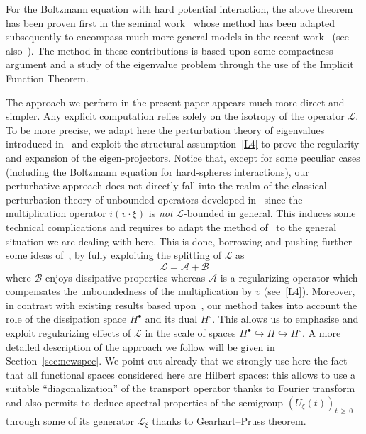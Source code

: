 \documentclass[10pt]{amsart}
\theoremstyle{definition}\newtheorem{defi}[theo]{Definition}\newtheorem{rema}[theo]{Remark}\newtheorem{exam}[theo]{Example}\newtheorem{exem}[theo]{Example}\newtheorem{nota}[theo]{Notation}
\renewcommand{\AA}{\mathcal{A}}
\newcommand{\BB}{\mathcal{B}}
\newcommand{\LL}{\mathcal{L}}
\newcommand{\Ss}{H}
\newcommand{\Ssp}{H^{\bullet}}
\newcommand{\Ssm}{H^{\circ}}
\renewcommand*\ge{\geqslant}
\begin{document}
For the Boltzmann equation with hard potential interaction, the above {theorem} has been proven first in the seminal work~\cite{EP1975} whose method has been {adapted} subsequently to encompass much more general models in the recent work~\cite{YY} (see also~\cite{LY2016, LY2017,YY23}). The method in these contributions is based upon some compactness argument and a study of the eigenvalue problem through the use of the Implicit Function Theorem.

The approach we perform in the present paper appears much more direct and simpler. Any explicit computation relies solely on the isotropy of the operator $\LL$. To be more precise, we adapt here the perturbation theory of eigenvalues introduced in~\cite{K1995} and exploit the structural assumption~\eqref{L4} to prove the regularity and expansion of the eigen-projectors. Notice that, except for some peculiar cases (including the Boltzmann equation for hard-spheres interactions), our perturbative approach does not directly fall into the realm of the classical perturbation theory of unbounded operators developed in~\cite{K1995} since the multiplication operator $i(v\cdot\xi)$ is \emph{not} $\LL$-bounded in general. This induces some technical complications and requires to adapt the method of~\cite{K1995} to the general situation we are dealing with here. This is done, borrowing and pushing further some ideas of~\cite{T2016}, by fully exploiting the splitting of $\LL$ as
\[
\LL=\AA+\BB
\]
where $\BB$ enjoys dissipative properties whereas $\AA$ is a regularizing operator which compensates the unboundedness of the multiplication by $v$ (see~\eqref{L4}). Moreover, in contrast with existing results based upon~\cite{EP1975}, our method takes into account the role of the dissipation space $\Ssp$ and its dual $\Ssm$. This allows us to emphasise and exploit regularizing effects of $\LL$ in the scale of spaces $\Ssp \hookrightarrow \Ss \hookrightarrow \Ssm$. A more detailed description of the approach we follow will be given in Section~\ref{sec:newspec}. We point out already that we strongly use here the fact that all functional spaces considered here are Hilbert spaces: this allows to use a suitable ``diagonalization'' of the transport operator thanks to Fourier transform and also permits to deduce spectral properties of the semigroup $\left(U_{\xi}(t)\right)_{t\,\ge\,0}$ through some of its generator $\LL_{\xi}$ thanks to Gearhart--Pruss theorem.
\end{document}

